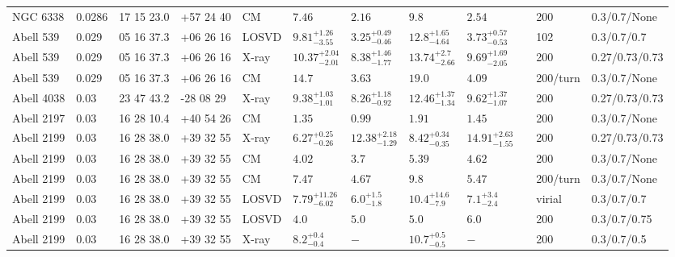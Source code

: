 \begin{landscape}
\begin{center}
{\begin{longtable}{llllllllllll}
NGC 6338 & 0.0286 & 17 15 23.0 & +57 24 40 & CM & ${7.46}^{}_{}$ & ${2.16}^{}_{}$ & ${9.8}^{}_{}$ & ${2.54}^{}_{}$ & \citet{RI06.1} & 200 & 0.3/0.7/None \\
Abell 539 & 0.029 & 05 16 37.3 & +06 26 16 & LOSVD & ${9.81}^{+1.26}_{-3.55}$ & ${3.25}^{+0.49}_{-0.46}$ & ${12.8}^{+1.65}_{-4.64}$ & ${3.73}^{+0.57}_{-0.53}$ & \citet{WO10.1} & 102 & 0.3/0.7/0.7 \\
Abell 539 & 0.029 & 05 16 37.3 & +06 26 16 & X-ray & ${10.37}^{+2.04}_{-2.01}$ & ${8.38}^{+1.46}_{-1.77}$ & ${13.74}^{+2.7}_{-2.66}$ & ${9.69}^{+1.69}_{-2.05}$ & \citet{BA14.1} & 200 & 0.27/0.73/0.73 \\
Abell 539 & 0.029 & 05 16 37.3 & +06 26 16 & CM & ${14.7}^{}_{}$ & ${3.63}^{}_{}$ & ${19.0}^{}_{}$ & ${4.09}^{}_{}$ & \citet{RI03.1} & 200/turn & 0.3/0.7/None \\
Abell 4038 & 0.03 & 23 47 43.2 & -28 08 29 & X-ray & ${9.38}^{+1.03}_{-1.01}$ & ${8.26}^{+1.18}_{-0.92}$ & ${12.46}^{+1.37}_{-1.34}$ & ${9.62}^{+1.37}_{-1.07}$ & \citet{BA14.1} & 200 & 0.27/0.73/0.73 \\
Abell 2197 & 0.03 & 16 28 10.4 & +40 54 26 & CM & ${1.35}^{}_{}$ & ${0.99}^{}_{}$ & ${1.91}^{}_{}$ & ${1.45}^{}_{}$ & \citet{RI06.1} & 200 & 0.3/0.7/None \\
Abell 2199 & 0.03 & 16 28 38.0 & +39 32 55 & X-ray & ${6.27}^{+0.25}_{-0.26}$ & ${12.38}^{+2.18}_{-1.29}$ & ${8.42}^{+0.34}_{-0.35}$ & ${14.91}^{+2.63}_{-1.55}$ & \citet{BA14.1} & 200 & 0.27/0.73/0.73 \\
Abell 2199 & 0.03 & 16 28 38.0 & +39 32 55 & CM & ${4.02}^{}_{}$ & ${3.7}^{}_{}$ & ${5.39}^{}_{}$ & ${4.62}^{}_{}$ & \citet{RI06.1} & 200 & 0.3/0.7/None \\
Abell 2199 & 0.03 & 16 28 38.0 & +39 32 55 & CM & ${7.47}^{}_{}$ & ${4.67}^{}_{}$ & ${9.8}^{}_{}$ & ${5.47}^{}_{}$ & \citet{RI03.1} & 200/turn & 0.3/0.7/None \\
Abell 2199 & 0.03 & 16 28 38.0 & +39 32 55 & LOSVD & ${7.79}^{+11.26}_{-6.02}$ & ${6.0}^{+1.5}_{-1.8}$ & ${10.4}^{+14.6}_{-7.9}$ & ${7.1}^{+3.4}_{-2.4}$ & \citet{LO06.1} & virial & 0.3/0.7/0.7 \\
Abell 2199 & 0.03 & 16 28 38.0 & +39 32 55 & LOSVD & ${4.0}^{}_{}$ & ${5.0}^{}_{}$ & ${5.0}^{}_{}$ & ${6.0}^{}_{}$ & \citet{KE02.2} & 200 & 0.3/0.7/0.75 \\
Abell 2199 & 0.03 & 16 28 38.0 & +39 32 55 & X-ray & ${8.2}^{+0.4}_{-0.4}$ & ${-}^{}_{}$ & ${10.7}^{+0.5}_{-0.5}$ & ${-}^{}_{}$ & \citet{XU01.1} & 200 & 0.3/0.7/0.5 \\

\end{longtable}}
\end{center}
\end{landscape}
